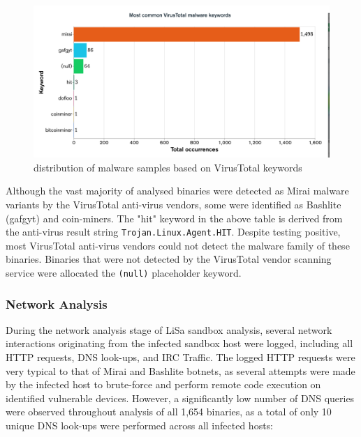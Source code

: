 \begin{figure}[!htb]
    \centering
    \includegraphics[width=0.75\linewidth]{results/vt_keywords.png}
    \caption{distribution of malware samples based on VirusTotal keywords}
    \label{fig:vt_keywords} 
\end{figure}

Although the vast majority of analysed binaries were detected as Mirai malware variants by the VirusTotal anti-virus vendors, some were identified as Bashlite (gafgyt) and coin-miners. The "hit" keyword in the above table is derived from the anti-virus result string \texttt{Trojan.Linux.Agent.HIT}. Despite testing positive, most VirusTotal anti-virus vendors could not detect the malware family of these binaries. Binaries that were not detected by the VirusTotal vendor scanning service were allocated the \texttt{(null)} placeholder keyword.


\subsubsection{Network Analysis}

During the network analysis stage of LiSa sandbox analysis, several network interactions originating from the infected sandbox host were logged, including all HTTP requests, DNS look-ups, and IRC Traffic. The logged HTTP requests were very typical to that of Mirai and Bashlite botnets, as several attempts were made by the infected host to brute-force and perform remote code execution on identified vulnerable devices. However, a significantly low number of DNS queries were observed throughout analysis of all 1,654 binaries, as a total of only 10 unique DNS look-ups were performed across all infected hosts:

